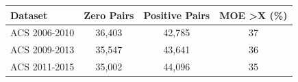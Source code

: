 \begin{tabular}{lccc}
\toprule Dataset & Zero Pairs & Positive Pairs & MOE \textgreater X (\%) \\
\midrule
 ACS 2006-2010 & 36,403 & 42,785 & 37\\
ACS 2009-2013 & 35,547 & 43,641 & 36\\
ACS 2011-2015 & 35,002 & 44,096 & 35\\
\bottomrule
 \end{tabular} 
